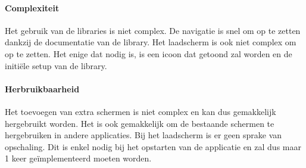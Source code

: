 \paragraph{Complexiteit}
Het gebruik van de libraries is niet complex. De navigatie is snel om op te zetten dankzij de documentatie van de library.
Het laadscherm is ook niet complex om op te zetten. Het enige dat nodig is, is een icoon dat getoond zal worden en de 
initiële setup van de library. 

\paragraph{Herbruikbaarheid}
Het toevoegen van extra schermen is niet complex en kan dus gemakkelijk hergebruikt worden. Het is ook gemakkelijk om de
bestaande schermen te hergebruiken in andere applicaties. Bij het laadscherm is er geen sprake van opschaling. Dit is enkel
nodig bij het opstarten van de applicatie en zal dus maar 1 keer geïmplementeerd moeten worden.
